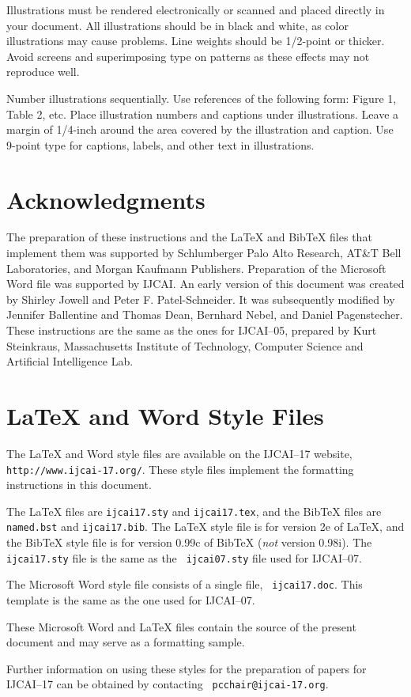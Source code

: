 \documentclass{article}
\theoremstyle{definition}
\begin{document}
Illustrations must be rendered electronically or scanned and placed
directly in your document. All illustrations should be in black and
white, as color illustrations may cause problems. Line weights should
be 1/2-point or thicker. Avoid screens and superimposing type on
patterns as these effects may not reproduce well.

Number illustrations sequentially. Use references of the following
form: Figure 1, Table 2, etc. Place illustration numbers and captions
under illustrations. Leave a margin of 1/4-inch around the area
covered by the illustration and caption.  Use 9-point type for
captions, labels, and other text in illustrations.

\section*{Acknowledgments}

The preparation of these instructions and the \LaTeX{} and Bib\TeX{}
files that implement them was supported by Schlumberger Palo Alto
Research, AT\&T Bell Laboratories, and Morgan Kaufmann Publishers.
Preparation of the Microsoft Word file was supported by IJCAI.  An
early version of this document was created by Shirley Jowell and Peter
F. Patel-Schneider.  It was subsequently modified by Jennifer
Ballentine and Thomas Dean, Bernhard Nebel, and Daniel Pagenstecher.
These instructions are the same as the ones for IJCAI--05, prepared by
Kurt Steinkraus, Massachusetts Institute of Technology, Computer
Science and Artificial Intelligence Lab.

\appendix

\section{\LaTeX{} and Word Style Files}\label{stylefiles}

The \LaTeX{} and Word style files are available on the IJCAI--17
website, {\tt http://www.ijcai-17.org/}.
These style files implement the formatting instructions in this
document.

The \LaTeX{} files are {\tt ijcai17.sty} and {\tt ijcai17.tex}, and
the Bib\TeX{} files are {\tt named.bst} and {\tt ijcai17.bib}. The
\LaTeX{} style file is for version 2e of \LaTeX{}, and the Bib\TeX{}
style file is for version 0.99c of Bib\TeX{} ({\em not} version
0.98i). The {\tt ijcai17.sty} file is the same as the {\tt
ijcai07.sty} file used for IJCAI--07.

The Microsoft Word style file consists of a single file, {\tt
ijcai17.doc}. This template is the same as the one used for
IJCAI--07.

These Microsoft Word and \LaTeX{} files contain the source of the
present document and may serve as a formatting sample.  

Further information on using these styles for the preparation of
papers for IJCAI--17 can be obtained by contacting {\tt
pcchair@ijcai-17.org}.



\end{document}

